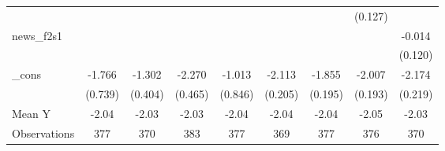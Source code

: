 {\begin{tabular}{l*{8}{c}}
            &                     &                     &                     &                     &                     &                     &     (0.127)         &                     \\
\addlinespace
news\_f2s1   &                     &                     &                     &                     &                     &                     &                     &      -0.014         \\
            &                     &                     &                     &                     &                     &                     &                     &     (0.120)         \\
\addlinespace
\_cons      &      -1.766\sym{**} &      -1.302\sym{***}&      -2.270\sym{***}&      -1.013         &      -2.113\sym{***}&      -1.855\sym{***}&      -2.007\sym{***}&      -2.174\sym{***}\\
            &     (0.739)         &     (0.404)         &     (0.465)         &     (0.846)         &     (0.205)         &     (0.195)         &     (0.193)         &     (0.219)         \\
\midrule
Mean Y      &       -2.04         &       -2.03         &       -2.03         &       -2.04         &       -2.04         &       -2.04         &       -2.05         &       -2.03         \\
Observations&         377         &         370         &         383         &         377         &         369         &         377         &         376         &         370         \\
\bottomrule
\end{tabular}
}
